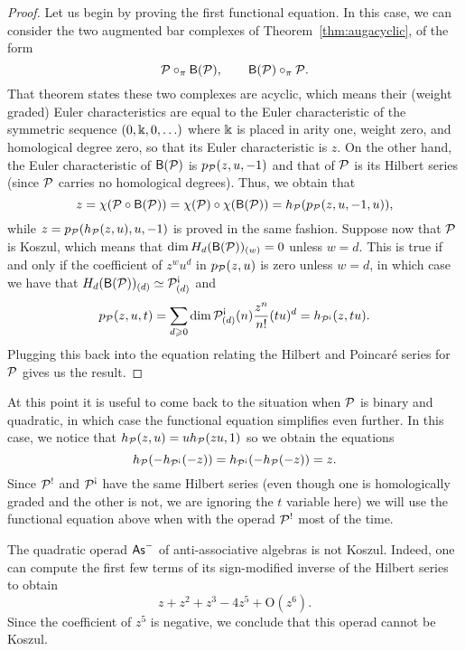 \begin{proof}
Let us begin by proving the first functional equation. In this case,
we can consider the two augmented bar complexes of Theorem~\ref{thm:augacyclic},
of the form
\[
{\mathcal{P}}\circ_\pi \mathsf{B}({\mathcal{P}}),\qquad \mathsf{B}({\mathcal{P}})\circ_\pi{\mathcal{P}}. 
\]
That theorem states these two complexes are acyclic, which means their
(weight graded) Euler characteristics are equal to the Euler characteristic 
of the symmetric sequence $(0,\Bbbk,0,\ldots)$ where $\Bbbk$ is placed in arity one,
weight zero, and homological degree zero, so that its Euler characteristic is
$z$. On the other hand, the Euler characteristic of $\mathsf{B}({\mathcal{P}})$ is
$p_{\mathcal{P}}(z,u,-1)$ and that of ${\mathcal{P}}$ is its Hilbert series (since ${\mathcal{P}}$ carries no
homological degrees). Thus, we obtain that 
\[
z = \chi({\mathcal{P}}\circ\mathsf{B}({\mathcal{P}})) = \chi({\mathcal{P}})\circ \chi(\mathsf{B}({\mathcal{P}})) = 
		h_{\mathcal{P}}(p_{\mathcal{P}}(z,u,-1,u)),
\]
while $z = p_{\mathcal{P}}(h_{\mathcal{P}}(z,u),u,-1)$ is proved in the same fashion. Suppose
now that ${\mathcal{P}}$ is Koszul, which means that $\dim H_d(\mathsf{B}({\mathcal{P}}))_{(w)} = 0$
unless $w=d$. This is true if and only if the coefficient of $z^wu^d$ in
$p_{\mathcal{P}}(z,u)$ is zero unless $w=d$, in which case we have that
$H_d(\B{\PP})_{(d)} \simeq  \PP^\antishriek_{(d)}$ and
\[
p_\PP(z,u,t) = \sum_{d\geqslant 0} \dim \PP^\antishriek_{(d)}(n) 
	\frac{z^n}{n!} (tu)^d = h_{\PP^\antishriek}(z,tu).
\]
Plugging this back into the equation relating the Hilbert and Poincar\'e
series for ${\mathcal{P}}$ gives us the result.
\end{proof}

At this point it is useful to come back to the situation when ${\mathcal{P}}$
is binary and quadratic, in which case the functional equation
simplifies even further. In this case, we notice that
$h_{\mathcal{P}}(z,u) = u h_{\mathcal{P}}(zu,1)$ so we obtain the equations  
\[
h_\PP(-h_{\PP^\antishriek}(-z)) = h_{\PP^\antishriek}(-h_\PP(-z)) = z. 
\]
Since ${\mathcal{P}}^!$ and $\PP^\antishriek$ have the same Hilbert series (even
though one is homologically graded and the other is not, we are
ignoring the $t$ variable here) we will use the functional equation above
when with the operad ${\mathcal{P}}^!$ most of the time.



\begin{example}
The quadratic operad $\mathsf{As}^-$ of anti-associative algebras is not Koszul.
Indeed, one can compute the first few terms of its sign-modified inverse of the 
Hilbert series to obtain
\[
z + z^2 + z^3  - 4 z^5 + \textrm{O}(z^{6}).
\]
Since the coefficient of $z^{5}$ is negative, we conclude that this operad cannot be Koszul. 
\end{example}

